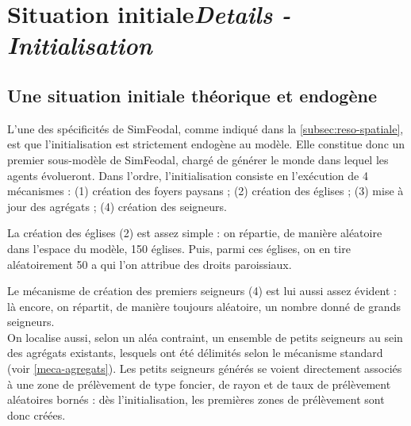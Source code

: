 \section[Situation initiale -- \textit{Details - Initialisation}]{Situation initiale\protect\newline \large{\textit{Details - Initialisation}}  \label{sec:initialisation}}

\subsection{Une situation initiale théorique et endogène}

L'une des spécificités de SimFeodal, comme indiqué dans la \cref{subsec:reso-spatiale}, est que l'initialisation est strictement endogène au modèle.
Elle constitue donc un premier \og sous-modèle\fg{} de SimFeodal, chargé de générer le monde dans lequel les agents évolueront.
Dans l'ordre, l'initialisation consiste en l'exécution de 4 mécanismes : (1) création des foyers paysans ; (2) création des églises ; (3) mise à jour des agrégats ; (4) création des seigneurs.

La création des églises (2) est assez simple : on répartie, de manière aléatoire dans l'espace du modèle, 150\unskip{} églises. Puis, parmi ces églises, on en tire aléatoirement 50 a qui l'on attribue des droits paroissiaux.

Le mécanisme de création des premiers seigneurs (4) est lui aussi assez évident : là encore, on répartit, de manière toujours aléatoire, un nombre donné de grands seigneurs.\\
On localise aussi, selon un aléa contraint, un ensemble de petits seigneurs au sein des agrégats existants, lesquels ont été délimités selon le mécanisme standard (voir \cref{meca-agregats}).
Les petits seigneurs générés se voient directement associés à une zone de prélèvement de type \og foncier\fg{}, de rayon et de taux de prélèvement aléatoires bornés : dès l'initialisation, les premières zones de prélèvement sont donc créées.

